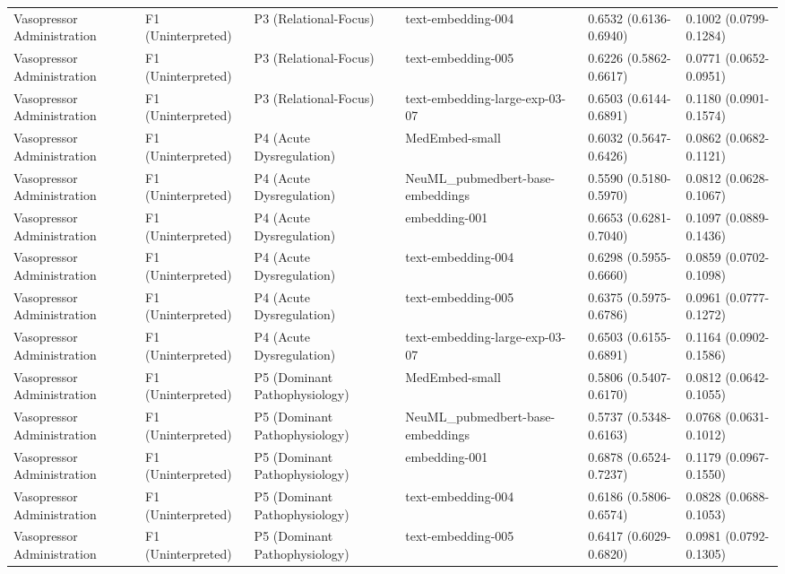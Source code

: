 \begin{tabular}{llllll}
Vasopressor Administration & F1 (Uninterpreted) & P3 (Relational-Focus) & text-embedding-004 & 0.6532 (0.6136-0.6940) & 0.1002 (0.0799-0.1284) \\
Vasopressor Administration & F1 (Uninterpreted) & P3 (Relational-Focus) & text-embedding-005 & 0.6226 (0.5862-0.6617) & 0.0771 (0.0652-0.0951) \\
Vasopressor Administration & F1 (Uninterpreted) & P3 (Relational-Focus) & text-embedding-large-exp-03-07 & 0.6503 (0.6144-0.6891) & 0.1180 (0.0901-0.1574) \\
Vasopressor Administration & F1 (Uninterpreted) & P4 (Acute Dysregulation) & MedEmbed-small & 0.6032 (0.5647-0.6426) & 0.0862 (0.0682-0.1121) \\
Vasopressor Administration & F1 (Uninterpreted) & P4 (Acute Dysregulation) & NeuML\_pubmedbert-base-embeddings & 0.5590 (0.5180-0.5970) & 0.0812 (0.0628-0.1067) \\
Vasopressor Administration & F1 (Uninterpreted) & P4 (Acute Dysregulation) & embedding-001 & 0.6653 (0.6281-0.7040) & 0.1097 (0.0889-0.1436) \\
Vasopressor Administration & F1 (Uninterpreted) & P4 (Acute Dysregulation) & text-embedding-004 & 0.6298 (0.5955-0.6660) & 0.0859 (0.0702-0.1098) \\
Vasopressor Administration & F1 (Uninterpreted) & P4 (Acute Dysregulation) & text-embedding-005 & 0.6375 (0.5975-0.6786) & 0.0961 (0.0777-0.1272) \\
Vasopressor Administration & F1 (Uninterpreted) & P4 (Acute Dysregulation) & text-embedding-large-exp-03-07 & 0.6503 (0.6155-0.6891) & 0.1164 (0.0902-0.1586) \\
Vasopressor Administration & F1 (Uninterpreted) & P5 (Dominant Pathophysiology) & MedEmbed-small & 0.5806 (0.5407-0.6170) & 0.0812 (0.0642-0.1055) \\
Vasopressor Administration & F1 (Uninterpreted) & P5 (Dominant Pathophysiology) & NeuML\_pubmedbert-base-embeddings & 0.5737 (0.5348-0.6163) & 0.0768 (0.0631-0.1012) \\
Vasopressor Administration & F1 (Uninterpreted) & P5 (Dominant Pathophysiology) & embedding-001 & 0.6878 (0.6524-0.7237) & 0.1179 (0.0967-0.1550) \\
Vasopressor Administration & F1 (Uninterpreted) & P5 (Dominant Pathophysiology) & text-embedding-004 & 0.6186 (0.5806-0.6574) & 0.0828 (0.0688-0.1053) \\
Vasopressor Administration & F1 (Uninterpreted) & P5 (Dominant Pathophysiology) & text-embedding-005 & 0.6417 (0.6029-0.6820) & 0.0981 (0.0792-0.1305) \\

\end{tabular}
